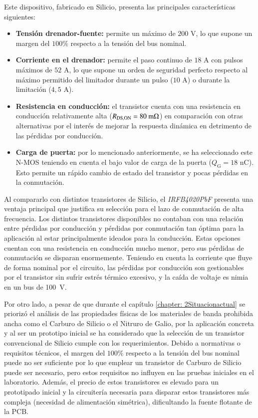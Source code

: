 \documentclass[12pt]{report} %
\begin{document}
Este dispositivo, fabricado en Silicio, presenta las principales características siguientes: 
\begin{itemize}
    \item \textbf{Tensión drenador-fuente:} permite un máximo de $200$ V, lo que supone un margen del $100\%$ respecto a la tensión del bus nominal. 
    \item \textbf{Corriente en el drenador:} permite el paso continuo de $18\text{ A}$ con pulsos máximos de $52\text{ A}$, lo que supone un orden de seguridad perfecto respecto al máximo permitido del limitador durante un pulso ($10\text{ A}$) o durante la limitación ($4{,}5\text{ A}$).
    \item \textbf{Resistencia en conducción:} el transistor cuenta con una resistencia en conducción relativamente alta ($R_{\text{DS,ON}} = 80 \text{ m}\Omega$) en comparación con otras alternativas por el interés de mejorar la respuesta dinámica en detrimento de las pérdidas por conducción.
    \item \textbf{Carga de puerta:} por lo mencionado anteriormente, se ha seleccionado este N-MOS teniendo en cuenta el bajo valor de carga de la puerta ($Q_\text{G} = 18 \text{ nC}$). Esto permite un rápido cambio de estado del transistor y pocas pérdidas en la conmutación. 
\end{itemize}

Al compararlo con distintos transistores de Silicio, el \textit{IRFB4020PbF} presenta una ventaja principal que justifica su selección para el lazo de conmutación de alta frecuencia. Los distintos transistores disponibles no contaban con una relación entre pérdidas por conducción y pérdidas por conmutación tan óptima para la aplicación al estar principalmente ideados para la conducción. 
Estas opciones cuentan con una resistencia en conducción mucho menor, pero sus pérdidas de conmutación se disparan enormemente. Teniendo en cuenta la corriente que fluye de forma nominal por el circuito, las pérdidas por conducción son gestionables por el transistor sin sufrir estrés térmico excesivo, y la caída de voltaje es nimia en un bus de 100~V. 

Por otro lado, a pesar de que durante el capítulo \ref{chapter: 2Situacionactual} se priorizó el análisis de las propiedades físicas de los materiales de banda prohibida ancha como el Carburo de Silicio o el Nitruro de Galio, por la aplicación concreta y al ser un prototipo inicial se ha considerado que la selección de un transistor convencional de Silicio cumple con los requerimientos. 
Debido a normativas o requisitos técnicos, el margen del $100\%$ respecto a la tensión del bus nominal puede no ser suficiente por lo que emplear un transistor de Carburo de Silicio puede ser necesario, pero estos requisitos no influyen en las pruebas iniciales en el laboratorio. Además, el precio de estos transistores es elevado para un prototipado inicial y la circuitería necesaria para disparar estos transistores más compleja (necesidad de alimentación simétrica), dificultando la fuente flotante de la PCB. 
\end{document}
